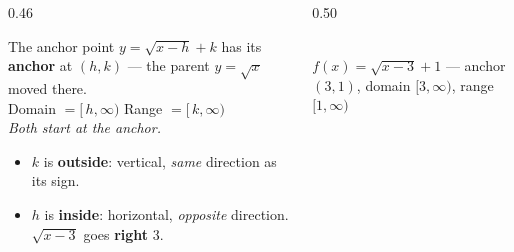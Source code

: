 \documentclass[aspectratio=169, 11pt]{beamer}
\newcommand{\lgrid}[4]{%
  \draw[step=1, linegray!45, thin] (#1,#3) grid (#2,#4);
  \draw[->, thick, charcoal] (#1,0)--(#2,0) node[below right, font=\tiny]{$x$};
  \draw[->, thick, charcoal] (0,#3)--(0,#4) node[left, font=\tiny]{$y$};}
\begin{document}
\begin{frame}[t, plain]
  \begin{columns}[T]
    \begin{column}{0.46\textwidth}
      \begin{block}{The anchor point}
        $y=\sqrt{x-h}+k$ has its \textbf{anchor} at $(h,k)$ --- the parent $y=\sqrt{x}$ moved there.
        \\[4pt]
        Domain $=[\,h,\infty)$ \quad Range $=[\,k,\infty)$ \\
        \emph{Both start at the anchor.}
      \end{block}
      \vspace{3pt}
      \footnotesize
      \begin{itemize}\setlength{\itemsep}{3pt}
        \item $k$ is \textbf{outside}: vertical, \emph{same} direction as its sign.
        \item $h$ is \textbf{inside}: horizontal, \emph{opposite} direction. $\sqrt{x-3}$ goes
              \textbf{right} $3$.
      \end{itemize}
    \end{column}
    \begin{column}{0.50\textwidth}
      \centering
      \\[2pt]
      {\footnotesize $f(x)=\sqrt{x-3}+1$ --- anchor $(3,1)$, domain $[3,\infty)$, range
      $[1,\infty)$}
    \end{column}
  \end{columns}
\end{frame}
\end{document}
